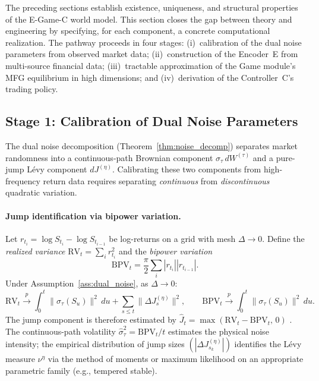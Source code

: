 \documentclass[12pt,a4paper]{article}
\theoremstyle{plain}
\theoremstyle{definition}
\newcommand{\1}{\mathbbm{1}}
\begin{document}
The preceding sections establish existence, uniqueness, and structural properties
of the E-Game-C world model.  This section closes the gap between theory and
engineering by specifying, for each component, a concrete computational realization.
The pathway proceeds in four stages: (i)~calibration of the dual noise parameters
from observed market data; (ii)~construction of the Encoder~E from multi-source
financial data; (iii)~tractable approximation of the Game module's MFG equilibrium
in high dimensions; and (iv)~derivation of the Controller~C's trading policy.

\subsection{Stage 1: Calibration of Dual Noise Parameters}
\label{subsec:calibration}

The dual noise decomposition (Theorem~\ref{thm:noise_decomp}) separates market
randomness into a continuous-path Brownian component $\sigma_\tau\,dW^{(\tau)}$
and a pure-jump Lévy component $dJ^{(\eta)}$.  Calibrating these two components
from high-frequency return data requires separating \emph{continuous} from
\emph{discontinuous} quadratic variation.

\paragraph{Jump identification via bipower variation.}
Let $r_{t_i} = \log S_{t_i} - \log S_{t_{i-1}}$ be log-returns on a grid with
mesh $\Delta \to 0$.  Define the \emph{realized variance}
$\mathrm{RV}_t = \sum_i r_{t_i}^2$ and the \emph{bipower variation}
\[
\mathrm{BPV}_t = \frac{\pi}{2}\sum_i |r_{t_i}||r_{t_{i-1}}|.
\]
Under Assumption~\ref{ass:dual_noise}, as $\Delta\to 0$:
\begin{equation}
\label{eq:jump_decomp_est}
\mathrm{RV}_t \xrightarrow{p} \int_0^t \|\sigma_\tau(S_u)\|^2\,du
  + \sum_{s\leq t}\|\Delta J^{(\eta)}_s\|^2,
\qquad
\mathrm{BPV}_t \xrightarrow{p} \int_0^t \|\sigma_\tau(S_u)\|^2\,du.
\end{equation}
The jump component is therefore estimated by $\widehat{J}_t = \max(\mathrm{RV}_t -
\mathrm{BPV}_t,\, 0)$ \citep{BarndorffNielsenShephard2004}.  The continuous-path
volatility $\hat\sigma_\tau^2 = \mathrm{BPV}_t / t$ estimates the physical noise
intensity; the empirical distribution of jump sizes $(|\Delta J^{(\eta)}_{s_k}|)$
identifies the Lévy measure $\nu^\eta$ via the method of moments or maximum
likelihood on an appropriate parametric family (e.g., tempered stable).
\end{document}
